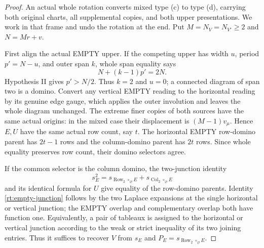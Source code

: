 \documentclass[11pt,a4paper]{amsart}
\numberwithin{equation}{section}
\theoremstyle{plain}
\theoremstyle{definition}
\newcommand{\Row}{\operatorname{Row}}
\newcommand{\Col}{\operatorname{Col}}
\begin{document}
\begin{proof}
An actual whole rotation converts mixed type (c) to type (d), carrying
both original charts, all supplemental copies, and both upper
presentations.  We work in that frame and undo the rotation at the end.
Put \(M=N_V=N_{V'}\ge2\) and \(N=Mr+v\).

First align the actual EMPTY upper.  If the competing upper has width
\(u\), period \(p'=N-u\), and outer span \(k\), whole span equality says
\[
 N+(k-1)p'=2N.
\]
Hypothesis II gives \(p'>N/2\).  Thus \(k=2\) and \(u=0\); a connected
diagram of span two is a domino.  Convert any vertical EMPTY reading
to the horizontal reading by its genuine edge gauge, which applies
the outer involution and leaves the whole diagram unchanged.
The extreme finer copies of both sources have the same actual origins:
in the mixed case their displacement is \((M-1)v_\mu\).  Hence \(E,U\)
have the same actual row count, say \(t\).  The horizontal EMPTY
row-domino parent has \(2t-1\) rows and the column-domino parent has
\(2t\) rows.  Since whole equality preserves row count, their domino
selectors agree.

If the common selector is the column domino, the two-junction identity
\begin{equation}\label{rt:empty-junction}
 s_E^2=s_{\Row_2\circ_\varnothing E}
                  +s_{\Col_2\circ_\varnothing E}
\end{equation}
and its identical formula for \(U\) give equality of the row-domino
parents.  Identity \eqref{rt:empty-junction} follows by the two
Laplace expansions at the single horizontal or vertical junction;
the EMPTY overlap and complementary overlap both have function one.
Equivalently, a pair of tableaux is assigned to the horizontal or
vertical junction according to the weak or strict inequality of its
two joining entries.  Thus it suffices to recover \(V\) from \(s_E\)
and
\(P_E=s_{\Row_2\circ_\varnothing E}\).


\end{proof}
\end{document}
